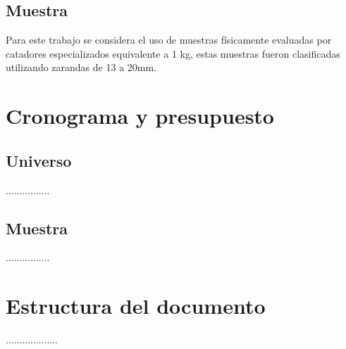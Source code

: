 \subsection{Muestra}
Para este trabajo se considera el uso de muestras físicamente evaluadas por catadores especializados equivalente a 1 kg, estas muestras fueron clasificadas utilizando zarandas de 13 a 20mm.


\section{Cronograma y presupuesto}

\subsection{Universo}
................

\subsection{Muestra}
................


\section{Estructura del documento}
...................